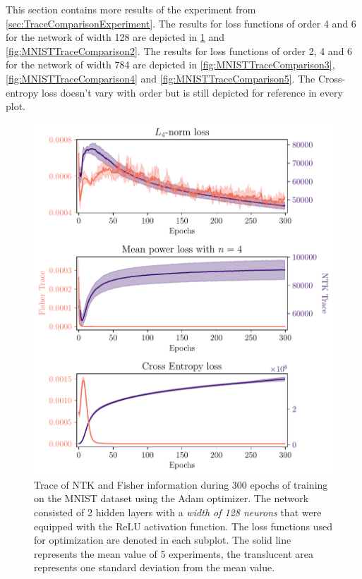 This section contains more results of the experiment from \cref{sec:TraceComparisonExperiment}. The results for loss functions of order 4 and 6 for the network of width 128 are depicted in \cref{fig:MNISTTraceComparison1} and \cref{fig:MNISTTraceComparison2}. The results for loss functions of order 2, 4 and 6 for the network of width 784 are depicted in \cref{fig:MNISTTraceComparison3}, \cref{fig:MNISTTraceComparison4} and \cref{fig:MNISTTraceComparison5}. The Cross-entropy loss doesn't vary with order but is still depicted for reference in every plot.

\begin{figure}
	\centering
	\includegraphics[width=\textwidth]{text/results/FisherNTKComparisonPlots/Triple_comparison_losses4_128.pdf}
	\caption{Trace of NTK and Fisher information during 300 epochs of training on the MNIST dataset using the Adam optimizer. The network consisted of 2 hidden layers with a \emph{width of 128 neurons} that were equipped with the ReLU activation function. The loss functions used for optimization are denoted in each subplot. The solid line represents the mean value of 5 experiments, the translucent area represents one standard deviation from the mean value.}
	\label{fig:MNISTTraceComparison1}
\end{figure}

